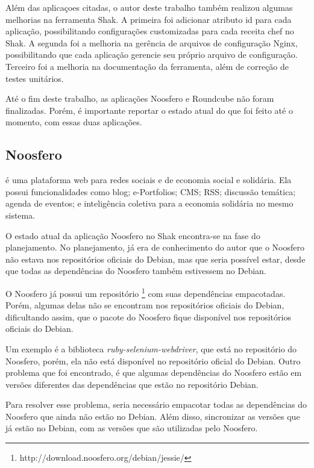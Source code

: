 Além das aplicaçoes citadas, o autor deste trabalho também realizou algumas melhorias
na ferramenta Shak. A primeira foi adicionar atributo id para cada aplicação, possibilitando
configurações customizadas para cada receita chef no Shak. A segunda foi a melhoria 
na gerência de arquivos de configuração Nginx, possibilitando que cada aplicação
gerencie seu próprio arquivo de configuração. Terceiro foi a melhoria na documentação
da ferramenta, além de correção de testes unitários.

Até o fim deste trabalho, as aplicações Noosfero e Roundcube não foram finalizadas. 
Porém, é importante reportar o estado atual do que foi feito até o momento,
com essas duas aplicações.

\subsection{Noosfero}
\label{subsub:noosfero}

 é uma plataforma web para redes sociais e 
de economia social e solidária. Ela possui funcionalidades como blog; e-Portfolios; 
CMS; RSS; discussão temática; agenda de eventos; e inteligência coletiva para a 
economia solidária no mesmo sistema.

O estado atual da aplicação Noosfero no Shak encontra-se
na fase do planejamento. No planejamento, já era de conhecimento do autor que o
Noosfero não estava nos repositórios oficiais do Debian, mas que seria possível estar, 
desde que todas as dependências do Noosfero também estivessem no Debian.

O Noosfero já possui um repositório \footnote{http://download.noosfero.org/debian/jessie/}
com suas dependências empacotadas. Porém, algumas delas não se encontram nos repositórios
oficiais do Debian, dificultando assim, que o pacote do Noosfero fique disponível
nos repositórios oficiais do Debian. 

Um exemplo é a biblioteca \textit{ruby-selenium-webdriver}, que
está no repositório do Noosfero, porém, ela não está disponível no repositório oficial
do Debian. Outro problema que foi encontrado, é que algumas dependências do Noosfero
estão em versões diferentes das dependências que estão no repositório Debian.

Para resolver esse problema, seria necessário empacotar todas as dependências
do Noosfero que ainda não estão no Debian. Além disso, sincronizar as versões
que já estão no Debian, com as versões que são utilizadas pelo Noosfero.

